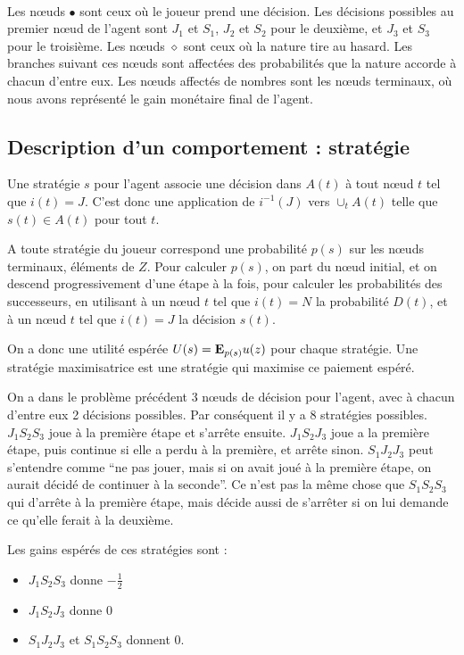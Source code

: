 \begin{exemple}
\begin{tabular}{p{1cm}p{1cm}p{1cm}p{1cm}p{1cm}p{1cm}}
\end{tabular}\\
Les n{\oe}uds $\bullet$ sont ceux où le joueur prend une décision.
Les décisions possibles au premier  n{\oe}ud de l'agent sont $J_1$
et $S_1$, $J_2$ et $S_2$ pour le deuxième, et $J_3$ et $S_3$ pour
le troisième. Les n{\oe}uds $\diamond$ sont ceux où la nature tire
au hasard. Les branches suivant ces n{\oe}uds sont affectées des
probabilités que la nature accorde à chacun d'entre eux. Les
n{\oe}uds affectés de nombres sont les n{\oe}uds terminaux, où
nous avons représenté le gain monétaire final de l'agent.

\end{exemple}

\subsection{Description d'un comportement : stratégie}

Une stratégie $s$ pour l'agent associe une décision dans $A(t)$ à
tout n{\oe}ud $t$ tel que $i(t)=J$. C'est donc une application de
$i^{-1}(J)$ vers $\cup_t A(t)$ telle que $s(t)\in A(t)$ pour tout
$t$.

A toute stratégie du joueur correspond une probabilité $p(s)$ sur
les n{\oe}uds terminaux, éléments de $Z$. Pour calculer $p(s)$, on
part du n{\oe}ud initial, et on descend progressivement d'une
étape à la fois, pour calculer les probabilités des successeurs,
en utilisant à un n{\oe}ud $t$ tel que $i(t)=N$ la probabilité
$D(t)$, et à un n{\oe}ud $t$ tel que $i(t)=J$ la décision $s(t)$.

On a donc une utilité espérée $U(s) = \mathbf{E}_{p(s)} u(z)$ pour chaque
stratégie. Une stratégie maximisatrice est une stratégie qui
maximise ce paiement espéré.

\begin{exemple}
On a dans le problème précédent 3 n{\oe}uds de décision pour
l'agent, avec à chacun d'entre eux 2 décisions possibles. Par
conséquent il y a 8 stratégies possibles. $J_1S_2S_3$ joue à la
première étape et s'arr\^ete ensuite. $J_1S_2J_3$ joue a la
première étape, puis continue si elle a perdu à la première, et
arr\^ete sinon. $S_1J_2J_3$ peut s'entendre comme ``ne pas jouer,
mais si on avait joué à la première étape, on aurait décidé de
continuer à la seconde''. Ce n'est pas la m\^eme chose que
$S_1S_2S_3$ qui d'arr\^ete à la première étape, mais décide aussi
de s'arr\^eter si on lui demande ce qu'elle ferait à la deuxième.

Les gains espérés de ces stratégies sont :
\begin{itemize}
\item $J_1S_2S_3$ donne $-\frac12$ %
\item $J_1S_2J_3$ donne $0$%
\item $S_1J_2J_3$ et $S_1S_2S_3$ donnent $0$.
\end{itemize}
\end{exemple}
%

